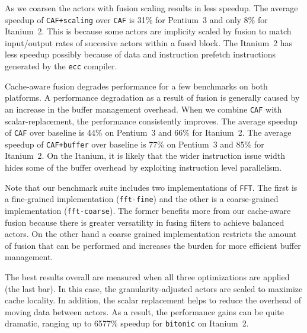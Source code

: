 As we coarsen the actors with fusion scaling results in less speedup.
The average speedup of \texttt{CAF+scaling} over \texttt{CAF} is
31\% for Pentium~3 and only 8\% for Itanium~2. This is because some actors
are implicity scaled by fusion to match input/output rates of succesive 
actors within a fused block. The Itanium~2 has less speedup possibly
because of data and instruction prefetch instructions generated by the 
\texttt{ecc} compiler.




Cache-aware fusion degrades performance for a few benchmarks on both platforms.
A performance degradation as a result of fusion is generally caused by
an increase in the buffer management overhead. When
we combine \texttt{CAF} with scalar-replacement, the
performance consistently improves. 
The average speedup of \texttt{CAF} over baseline is 44\% on Pentium~3
and 66\% for Itanium~2. 
The average speedup of \texttt{CAF+buffer} over baseline is 77\% on Pentium~3
and 85\% for Itanium~2. 
On the Itanium, it is likely that
the wider instruction issue width hides some of the buffer overhead by
exploiting instruction level parallelism.

Note that our benchmark suite
includes two implementations of \texttt{FFT}. The first is a
fine-grained implementation (\texttt{fft-fine}) and the other is a
coarse-grained implementation (\texttt{fft-coarse}). The former
benefits more from our cache-aware fusion because there is greater
versatility in fusing filters to achieve balanced actors. On the other hand
a coarse grained implementation restricts the amount of fusion that
can be performed and increases the burden for more efficient buffer
management. 


The best results overall are measured when all three optimizations are
applied (the last bar). In this case, the granularity-adjusted actors
are scaled to maximize cache locality. In addition, the scalar replacement
helps to reduce the overhead of moving data
between actors. As a result, the performance gains can be quite
dramatic, ranging up to 6577\% speedup for \texttt{bitonic} on Itanium~2.



